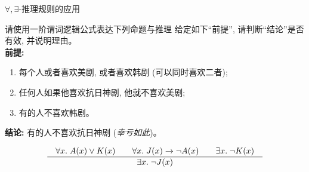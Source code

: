 \begin{frame}{\texorpdfstring{$\forall, \exists$}{forall, exists}-推理规则的应用}
  \begin{exampleblock}{请使用一阶谓词逻辑公式表达下列命题与推理}
    给定如下``前提'', 请判断``结论''是否有效, 并说明理由。\\[10pt]
    {\bf 前提:}
    \begin{enumerate}[(1)]
      \item 每个人或者喜欢美剧, 或者喜欢韩剧 (可以同时喜欢二者);
      \item 任何人如果他喜欢抗日神剧, 他就不喜欢美剧;
      \item 有的人不喜欢韩剧。
    \end{enumerate}

    \vspace{0.20cm}
    {\bf 结论:} 有的人不喜欢抗日神剧 ({\it 幸亏如此})。
  \end{exampleblock}

  \pause
  \vspace{0.50cm}
  \[
    \frac{\quad\forall x.\; A(x) \lor K(x) \qquad
      \forall x.\; J(x) \to \lnot A(x) \qquad
      \exists x.\; \lnot K(x)\quad}{\quad\exists x.\; \lnot J(x)\quad}
  \]
\end{frame}


